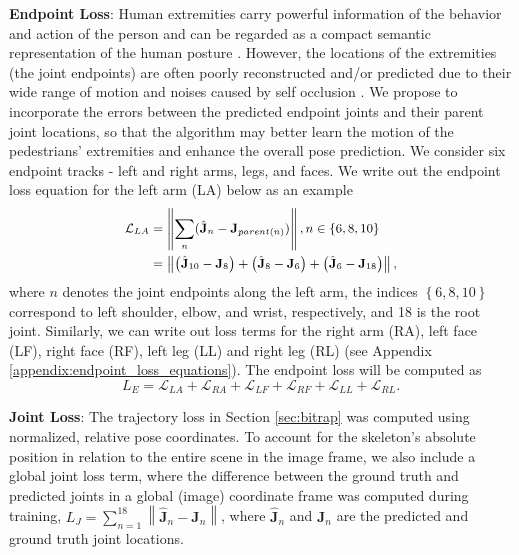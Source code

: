\documentclass[nohyperref]{article}
\theoremstyle{plain}
\theoremstyle{definition}
\theoremstyle{remark}
\begin{document}
\vspace{-1mm}

\textbf{Endpoint Loss}: 
Human extremities carry powerful information of the behavior and action of the person and can be regarded as a compact semantic representation of the
human posture \cite{yu2009human}. However, the locations of the extremities (the joint endpoints) are often poorly reconstructed and/or predicted due to their wide range of motion and noises caused by self occlusion \cite{huang2018deep, du2020unsupervised}. We propose to incorporate the errors between the predicted endpoint joints and their parent joint locations, so that the algorithm may better learn the motion of the pedestrians' extremities and enhance the overall pose prediction. We consider six endpoint tracks - left and right arms, legs, and faces. We write out the endpoint loss equation for the left arm (LA) below as an example
\begin{align}
\label{eqn:altendpoint1}
\small
\begin{split}
\mathcal{L}_{LA} &= \left \| \sum_n (\hat{\mathbf{J}}_n - \mathbf{J}_{parent(n)})\right \|,  n\in \left \{ 6,8,10\right \}
\\
&=  \left \| \left (\hat{\mathbf{J}}_{10} - {\mathbf{J}}_{8} \right ) + \left (\hat{\mathbf{J}}_{8} - {\mathbf{J}}_{6} \right ) + \left (\hat{\mathbf{J}}_{6} - \mathbf{J}_{18} \right ) \right \| ,
\end{split}
\end{align}
where $n$ denotes the joint endpoints along the left arm,  the indices $\left \{ 6,8,10\right \}$ correspond to left shoulder, elbow, and wrist, respectively, and 18 is the root joint. Similarly, we can write out loss terms for the right arm (RA), left face (LF), right face (RF), left leg (LL) and right leg (RL) (see Appendix \ref{appendix:endpoint_loss_equations}). The endpoint loss will be computed as 
\begin{equation}
\label{eqn:endpointloss}
L_{E} = \mathcal{L}_{LA} + \mathcal{L}_{RA} + \mathcal{L}_{LF} + \mathcal{L}_{RF} + \mathcal{L}_{LL} + \mathcal{L}_{RL}.
\end{equation}


\vspace{-1mm}

\textbf{Joint Loss}: The trajectory loss in Section \ref{sec:bitrap} was computed using normalized, relative pose coordinates. To account for the skeleton’s absolute position in relation to the entire scene in the image frame, we also include a global joint loss term, where the difference between the ground truth and predicted joints in a global (image) coordinate frame was computed during training, $L_J = \sum_{n=1}^{18} \left \| \hat{\mathbf{J}}_{n} - \mathbf{J}_{n} \right \|$,
where $\hat{\mathbf{J}}_{n}$ and ${\mathbf{J}}_{n}$ are the predicted and ground truth joint locations. 
\end{document}
